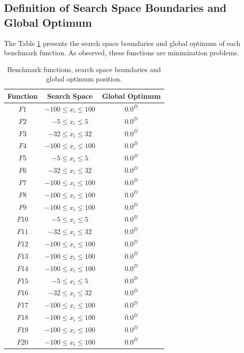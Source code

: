 \subsection{Definition of Search Space Boundaries and Global Optimum}
The Table \ref{tab:SearchSpace_Optimum} presents the search space boundaries and global optimum of each benchmark function. As observed, these functions are minimization problems.
\begin{table}[!h]
\caption{Benchmark functions, search space boundaries and global optimum position.}
\centering
\begin{tabular}{c c c}
\hline
Function  &   Search Space               &  Global Optimum  \\
\hline
$F1$    & $-100 \leq x_i \leq 100$     & $0.0^D$ \\
$F2$    & $-5 \leq x_i \leq 5$     & $0.0^D$ \\
$F3$    & $-32 \leq x_i \leq 32$     & $0.0^D$ \\
$F4$    & $-100 \leq x_i \leq 100$     & $0.0^D$ \\
$F5$    & $-5 \leq x_i \leq 5$     & $0.0^D$ \\
$F6$    & $-32 \leq x_i \leq 32$     & $0.0^D$ \\
$F7$    & $-100 \leq x_i \leq 100$     & $0.0^D$ \\
$F8$    & $-100 \leq x_i \leq 100$     & $0.0^D$ \\
$F9$    & $-100 \leq x_i \leq 100$     & $0.0^D$ \\
$F10$    & $-5 \leq x_i \leq 5$     & $0.0^D$ \\
$F11$    & $-32 \leq x_i \leq 32$     & $0.0^D$ \\
$F12$    & $-100 \leq x_i \leq 100$     & $0.0^D$ \\
$F13$    & $-100 \leq x_i \leq 100$     & $0.0^D$ \\
$F14$    & $-100 \leq x_i \leq 100$     & $0.0^D$ \\
$F15$    & $-5 \leq x_i \leq 5$     & $0.0^D$ \\
$F16$    & $-32 \leq x_i \leq 32$     & $0.0^D$ \\
$F17$    & $-100 \leq x_i \leq 100$     & $0.0^D$ \\
$F18$    & $-100 \leq x_i \leq 100$     & $0.0^D$ \\
$F19$    & $-100 \leq x_i \leq 100$     & $0.0^D$ \\
$F20$    & $-100 \leq x_i \leq 100$     & $0.0^D$ \\
\hline
\end{tabular}
\label{tab:SearchSpace_Optimum}
\end{table}

